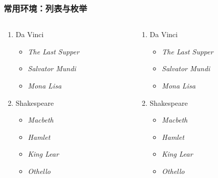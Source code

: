 \begin{frame}[fragile]
\frametitle{常用环境：列表与枚举}
\begin{columns}
\begin{column}{0.55\textwidth}
  \begin{texcode}[gobble=4, emph={[1]enumerate,itemize}]
    \begin{enumerate}
      \item Da Vinci
        \begin{itemize}
          \item \textit{The Last Supper}
          \item \textit{Salvator Mundi}
          \item \textit{Mona Lisa}
        \end{itemize}
      \item Shakespeare
        \begin{itemize}
          \item \textit{Macbeth}
          \item \textit{Hamlet}
          \item \textit{King Lear}
          \item \textit{Othello}
        \end{itemize}
    \end{enumerate}
  \end{texcode}
\end{column}
\pause
\begin{column}{0.35\textwidth}
  \begin{enumerate}
    \item Da Vinci
      \begin{itemize}
        \item \textit{The Last Supper}
        \item \textit{Salvator Mundi}
        \item \textit{Mona Lisa}
      \end{itemize}
    \item Shakespeare
      \begin{itemize}
        \item \textit{Macbeth}
        \item \textit{Hamlet}
        \item \textit{King Lear}
        \item \textit{Othello}
      \end{itemize}
  \end{enumerate}
\end{column}
\end{columns}
\end{frame}

